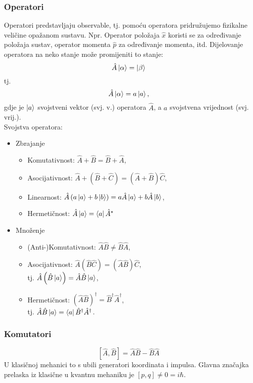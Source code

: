 \documentclass{article}
\numberwithin{equation}{section}
\begin{document}
\subsubsection{Operatori}
Operatori predstavljaju observable, tj. pomoću operatora pridružujemo fizikalne veličine opažanom sustavu. Npr. Operator položaja $\hat{x}$
koristi se za određivanje položaja sustav, operator momenta $\hat{p}$ za određivanje momenta, itd.
Dijelovanje operatora na neko stanje može promijeniti to stanje:
\begin{equation}
	\hat{A}\ket{\alpha} = \ket{\beta}
\end{equation}
tj.
\begin{equation}
\hat{A}\ket{\alpha} = a \ket{a},
\end{equation}
gdje je $\ket{a}$ svojstveni vektor (svj. v.) operatora $\hat{A}$, a $a$ svojstvena vrijednost (svj. vrij.).\\

Svojstva operatora:
\begin{itemize}
	\item Zbrajanje
	\begin{itemize}
	\item Komutativnost: $\hat{A} + \hat{B} = \hat{B} + \hat{A}$,
	\item Asocijativnost: $\hat{A} + \left(\hat{B} + \hat{C}\right) = \left(\hat{A} + \hat{B} \right) \hat{C}$,
	\item Linearnost: $\hat{A}\left(a\ket{a}+b\ket{b}\right) = a\hat{A}\ket{a} + b\hat{A}\ket{b}$,
	\item Hermetičnost: $\hat{A}\ket{a} = \bra{a}\hat{A}^*$
	\end{itemize}
\item Množenje
	\begin{itemize}
		\item (Anti-)Komutativnost: $\hat{A}\hat{B} \ne \hat{B} \hat{A}$,
		\item Asocijativnost: $\hat{A}\left(\hat{B}\hat{C}\right) = \left(\hat{A}\hat{B}\right)\hat{C}$,\\
			tj. $\hat{A}\left(\hat{B}\ket{a}\right)=\hat{A}\hat{B}\ket{a}$,
		\item Hermetičnost: $\left(\hat{A}\hat{B}\right)^{\dagger} = \hat{B}^{\dagger}\hat{A}^{\dagger}$,\\
			tj. $\hat{A}\hat{B} \ket{a} = \bra{a} \hat{B}^{\dagger} \hat{A}^{\dagger}$.
	\end{itemize}

\end{itemize}
\subsubsection{Komutatori}
\begin{equation}
	\left[\hat{A},\hat{B}\right] = \hat{A} \hat{B} - \hat{B}\hat{A}
\end{equation}
U klasičnoj mehanici to s ubili generatori koordinata i impulsa. Glavna značajka prelaska iz klasične u kvantnu mehaniku je $\left[p,q\right]\ne0=i\hbar$.
\end{document}
